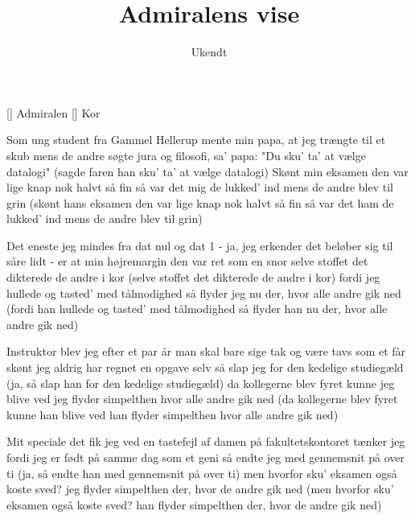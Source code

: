\documentclass[a4paper,11pt]{article}
\title{Admiralens vise}
\author{Ukendt}
\begin{document}
\maketitle

\begin{roles}
[] Admiralen 
[] Kor
\end{roles}

\begin{song}
     Som ung student fra Gammel Hellerup
              mente min papa, at jeg trængte til et skub
              mens de andre søgte jura og filosofi,
              sa' papa: "Du sku' ta' at vælge datalogi"
              (sagde faren han sku' ta' at vælge datalogi)
              Skønt min eksamen den var lige knap nok halvt så fin
              så var det mig de lukked' ind mens de andre blev til grin
              (skønt hans eksamen den var lige knap nok halvt så fin
              så var det ham de lukked' ind mens de andre blev til grin)

     Det eneste jeg mindes fra dat nul og dat 1
              - ja, jeg erkender det beløber sig til såre lidt -
              er at min højremargin den var ret som en snor
              selve stoffet det dikterede de andre i kor
              (selve stoffet det dikterede de andre i kor)
              fordi jeg hullede og tasted' med tålmodighed
              så flyder jeg nu der, hvor alle andre gik ned
              (fordi han hullede og tasted' med tålmodighed
              så flyder han nu der, hvor alle andre gik ned)

     Instruktor blev jeg efter et par år
              man skal bare sige tak og være tavs som et får
              skønt jeg aldrig har regnet en opgave selv
              så slap jeg for den kedelige studiegæld
              (ja, så slap han for den kedelige studiegæld)
              da kollegerne blev fyret kunne jeg blive ved
              jeg flyder simpelthen hvor alle andre gik ned
              (da kollegerne blev fyret kunne han blive ved
              han flyder simpelthen hvor alle andre gik ned)

     Mit speciale det fik jeg ved en tastefejl
              af damen på fakultetskontoret tænker jeg
              fordi jeg er født på samme dag som et geni
              så endte jeg med gennemsnit på over ti
              (ja, så endte han med gennemsnit på over ti)
              men hvorfor sku' eksamen også koste sved?
              jeg flyder simpelthen der, hvor de andre gik ned
              (men hvorfor sku' eksamen også koste sved?
              han flyder simpelthen der, hvor de andre gik ned)


\end{song}
\end{document}
